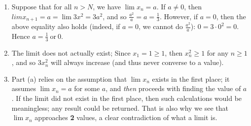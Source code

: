 \documentclass{homework}
\begin{document}
\begin{solution}
  \begin{enumerate}[label=(\alph*)]
    \item Suppose that for all $n>N$, we have $\lim{x_n}=a$. If $a\neq 0$, then
      $lim{x_{n+1}}=a=\lim{3x^2}=3a^2$, and so $\frac{a^2}{a}=a=\frac{1}{3}$. However, if $a=0$,
      then the above equality also holds (indeed, if $a=0$, we cannot do $\frac{a^2}{a}$): $0=3\cdot
      0^2=0$. Hence $a=\frac{1}{3}~\text{or}~0$.
    \item The limit does not actually exist; Since $x_1=1\ge 1$, then $x_n^2\ge 1$ for any $n\ge 1$,
      and so $3x_n^2$ will always increase (and thus never converse to a value).
    \item Part (a) relies on the assumption that $\lim{x_n}$ exists in the first place; it assumes
      $\lim{x_n}=a$ for some $a$, and \textit{then} proceeds with finding the value of $a$. If the
      limit did not exist in the first place, then such calculations would be meaningless; any
      result could be returned. That is also why we see that $\lim{x_n}$ approaches \textbf{2}
      values, a clear contradiction of what a limit is.
  \end{enumerate}
\end{solution}
\end{document}
